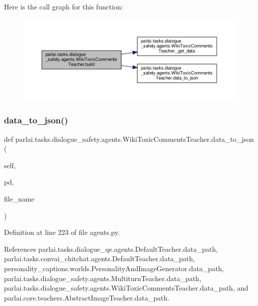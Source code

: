 Here is the call graph for this function\+:
\nopagebreak
\begin{figure}[H]
\begin{center}
\leavevmode
\includegraphics[width=350pt]{classparlai_1_1tasks_1_1dialogue__safety_1_1agents_1_1WikiToxicCommentsTeacher_acbc5c579a2791af831f6e4f72dc8560c_cgraph}
\end{center}
\end{figure}
\mbox{\label{classparlai_1_1tasks_1_1dialogue__safety_1_1agents_1_1WikiToxicCommentsTeacher_ab05b135cb36558dab5a04b4b00167159}} 
\subsubsection{\texorpdfstring{data\+\_\+to\+\_\+json()}{data\_to\_json()}}
{\footnotesize\ttfamily def parlai.\+tasks.\+dialogue\+\_\+safety.\+agents.\+Wiki\+Toxic\+Comments\+Teacher.\+data\+\_\+to\+\_\+json (\begin{DoxyParamCaption}\item[{}]{self,  }\item[{}]{pd,  }\item[{}]{file\+\_\+name }\end{DoxyParamCaption})}



Definition at line 223 of file agents.\+py.



References parlai.\+tasks.\+dialogue\+\_\+qe.\+agents.\+Default\+Teacher.\+data\+\_\+path, parlai.\+tasks.\+convai\+\_\+chitchat.\+agents.\+Default\+Teacher.\+data\+\_\+path, personality\+\_\+captions.\+worlds.\+Personality\+And\+Image\+Generator.\+data\+\_\+path, parlai.\+tasks.\+dialogue\+\_\+safety.\+agents.\+Multiturn\+Teacher.\+data\+\_\+path, parlai.\+tasks.\+dialogue\+\_\+safety.\+agents.\+Wiki\+Toxic\+Comments\+Teacher.\+data\+\_\+path, and parlai.\+core.\+teachers.\+Abstract\+Image\+Teacher.\+data\+\_\+path.



